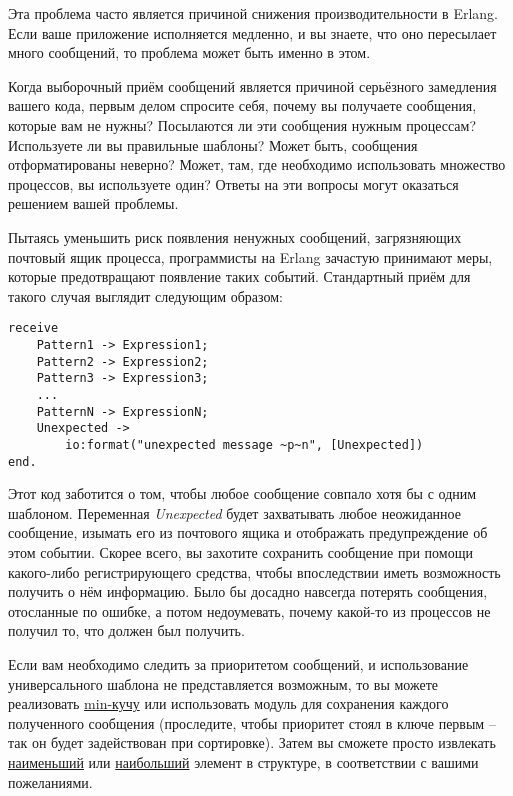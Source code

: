 Эта проблема часто является причиной снижения производительности в Erlang.
Если ваше приложение исполняется медленно, и вы знаете, что оно пересылает много сообщений, то проблема может быть именно в этом.

Когда выборочный приём сообщений является причиной серьёзного замедления вашего кода, первым делом спросите себя, почему вы получаете сообщения, которые вам не нужны?
Посылаются ли эти сообщения нужным процессам?
Используете ли вы правильные шаблоны?
Может быть, сообщения отформатированы неверно?
Может, там, где необходимо использовать множество процессов, вы используете один?
Ответы на эти вопросы могут оказаться решением вашей проблемы.

Пытаясь уменьшить риск появления ненужных сообщений, загрязняющих почтовый ящик процесса, программисты на Erlang зачастую принимают меры, которые предотвращают появление таких событий.
Стандартный приём для такого случая выглядит следующим образом:
\begin{lstlisting}[style=erlang]
receive
    Pattern1 -> Expression1;
    Pattern2 -> Expression2;
    Pattern3 -> Expression3;
    ...
    PatternN -> ExpressionN;
    Unexpected ->
        io:format("unexpected message ~p~n", [Unexpected])
end.
\end{lstlisting}

Этот код заботится о том, чтобы любое сообщение совпало хотя бы с одним шаблоном.
Переменная \emph{Unexpected} будет захватывать любое неожиданное сообщение, изымать его из почтового ящика и отображать предупреждение об этом событии.
Скорее всего, вы захотите сохранить сообщение при помощи какого\--либо регистрирующего средства, чтобы впоследствии иметь возможность получить о нём информацию.
Было бы досадно навсегда потерять сообщения, отосланные по ошибке, а потом недоумевать, почему какой\--то из процессов не получил то, что должен был получить.

Если вам необходимо следить за приоритетом сообщений, и использование универсального шаблона не представляется возможным, то вы можете реализовать \href{http://en.wikipedia.org/wiki/Min-heap}{min\--кучу} или использовать модуль  для сохранения каждого полученного сообщения (проследите, чтобы приоритет стоял в ключе первым \--- так он будет задействован при сортировке).
Затем вы сможете просто извлекать \href{http://erldocs.com/R15B/gb_trees.html\#take_smallest/1}{наименьший} или \href{http://erldocs.com/R15B/gb_trees.html\#take_largest/1}{наибольший} элемент в структуре, в соответствии с вашими пожеланиями.

